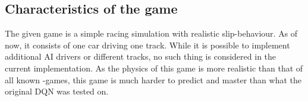 %
%


\subsection{Characteristics of the game}



The given game is a simple racing simulation with realistic slip-behaviour. As of now, it consists of one car driving one track. While it is possible to implement additional AI drivers or different tracks, no such thing is considered in the current implementation. As the physics of this game is more realistic than that of all known -games, this game is much harder to predict and master than what the original DQN was tested on.

